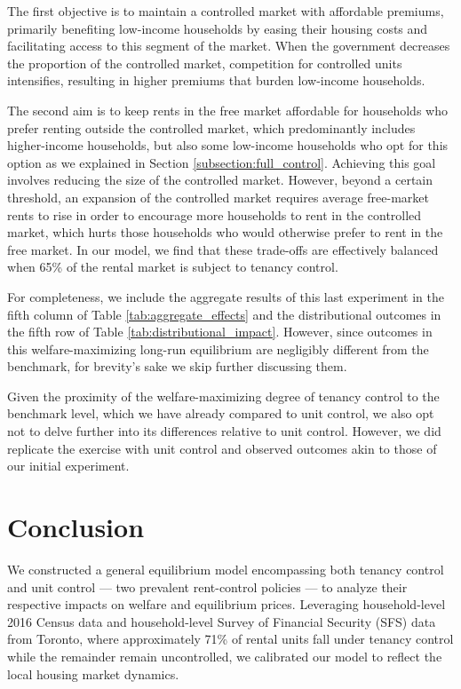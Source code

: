 \documentclass[parskip=full]{article}
\begin{document}
The first objective is to maintain a controlled market with affordable premiums, primarily benefiting low-income households by easing their housing costs and facilitating access to this segment of the market. When the government decreases the proportion of the controlled market, competition for controlled units intensifies, resulting in higher premiums that burden low-income households.

The second aim is to keep rents in the free market affordable for households who prefer renting outside the controlled market, which predominantly includes higher-income households, but also some low-income households who opt for this option as we explained in Section \ref{subsection:full_control}. Achieving this goal involves reducing the size of the controlled market. However, beyond a certain threshold, an expansion of the controlled market requires average free-market rents to rise in order to encourage more households to rent in the controlled market, which hurts those households who would otherwise prefer to rent in the free market. In our model, we find that these trade-offs are effectively balanced when 65\% of the rental market is subject to tenancy control.

For completeness, we include the aggregate results of this last experiment in the fifth column of Table \ref{tab:aggregate_effects} and the distributional outcomes in the fifth row of Table \ref{tab:distributional_impact}. However, since outcomes in this welfare-maximizing long-run equilibrium are negligibly different from the benchmark, for brevity's sake we skip further discussing them.

Given the proximity of the welfare-maximizing degree of tenancy control to the benchmark level, which we have already compared to unit control, we also opt not to delve further into its differences relative to unit control. However, we did replicate the exercise with unit control and observed outcomes akin to those of our initial experiment.

\section{Conclusion}\label{sec:conclusion}

We constructed a general equilibrium model encompassing both tenancy control and unit control --- two prevalent rent-control policies --- to analyze their respective impacts on welfare and equilibrium prices. Leveraging household-level 2016 Census data and household-level Survey of Financial Security (SFS) data from Toronto, where approximately 71\% of rental units fall under tenancy control while the remainder remain uncontrolled, we calibrated our model to reflect the local housing market dynamics.
\end{document}
